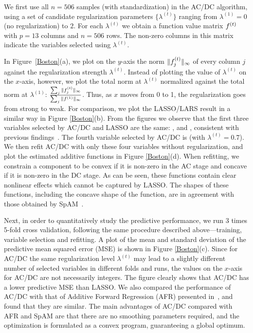 We first use all $n=506$ samples (with standardization) in the AC/DC algorithm,
using a set of candidate regularization parameters $\{\lambda^{(t)}\}$
ranging from $\lambda^{(1)} = 0$ (no regularization) to $2$. For each $\lambda^{(t)}$
we obtain a function value matrix $f^{(t)}$ with $p=13$
columns and $n=506$ rows. The non-zero columns in this matrix indicate the variables selected using $\lambda^{(t)}$.  

In Figure~\ref{Boston}(a), we plot on the $y$-axis the norm
$\|f^{(t)}_j\|_{\infty}$ of every column $j$ against the
regularization strength $\lambda^{(t)}$. Instead of plotting the value
of $\lambda^{(t)}$ on the $x$-axis,  however, we plot the total norm at
$\lambda^{(t)}$ normalized against the total norm at $\lambda^{(1)}$:
$\frac{\sum_j \|f^{(t)}_j\|_{\infty}}{\sum_j
  \|f^{(1)}\|_{\infty}}$. Thus, as $x$ moves from 0 to 1, the
regularization goes from strong to weak. For comparison, we plot the
LASSO/LARS result in a similar way in Figure \ref{Boston}(b).  From
the figures we observe that the first three variables selected by
AC/DC and LASSO are the same: ,  and ,
consistent with previous findings~\citep{SpAM:07}.  The fourth
variable selected by AC/DC is  (with $\lambda^{(t)}=0.7$).
We then refit AC/DC with only these four variables without
regularization, and plot the estimated additive functions in Figure
\ref{Boston}(d). When refitting, we constrain a component to be convex
if it is non-zero in the AC stage and concave if it is non-zero in the
DC stage. As can be seen, these functions contain clear nonlinear
effects which cannot be captured by LASSO. The shapes of these
functions, including the concave shape of the  function,
are in agreement with those obtained by SpAM~\citep{SpAM:07}.

Next, in order to quantitatively study the predictive performance, we
run 3 times 5-fold cross validation, following the same procedure
described above---training, variable selection and refitting.  A plot
of the mean and standard deviation of the predictive mean squared
error (MSE) is shown in Figure \ref{Boston}(c). Since for AC/DC the same
regularization level $\lambda^{(t)}$ may lead to a slightly different number of selected
variables in different folds and runs, the values on the $x$-axis
for AC/DC are not necessarily integers. The figure clearly shows that AC/DC has a 
lower predictive MSE than LASSO.  We also compared the performance of
AC/DC with that of Additive Forward Regression (AFR) presented
in~\cite{Xi:09}, and found that they are similar.  The main advantages
of AC/DC compared with AFR and SpAM are that there are no smoothing
parameters required, and the optimization is formulated
as a convex program, guaranteeing a global optimum.

